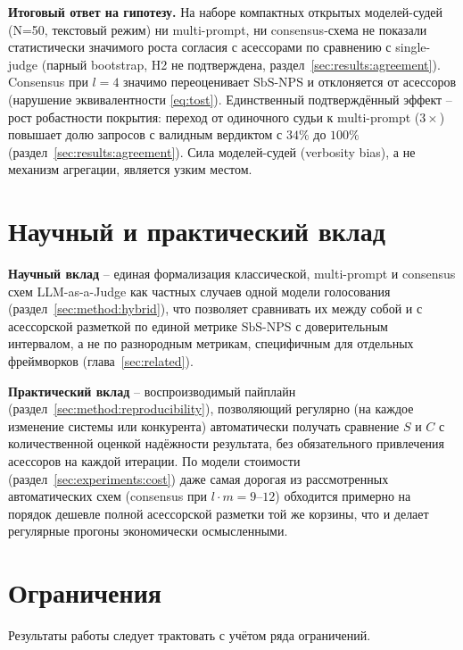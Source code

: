 \textbf{Итоговый ответ на гипотезу.}
На наборе компактных открытых моделей-судей (N=50, текстовый режим) ни multi-prompt, ни consensus-схема не показали статистически значимого роста согласия с асессорами по сравнению с single-judge (парный bootstrap, H2 не подтверждена, раздел~\ref{sec:results:agreement}). Consensus при $l=4$ значимо переоценивает $\mathrm{SbS\text{-}NPS}$ и отклоняется от асессоров (нарушение эквивалентности \eqref{eq:tost}). Единственный подтверждённый эффект -- рост робастности покрытия: переход от одиночного судьи к multi-prompt ($3\times$) повышает долю запросов с валидным вердиктом с $34\%$ до $100\%$ (раздел~\ref{sec:results:agreement}). Сила моделей-судей (verbosity bias), а не механизм агрегации, является узким местом.

\section{Научный и практический вклад}

\textbf{Научный вклад} -- единая формализация классической,
multi-prompt и consensus схем LLM-as-a-Judge как частных случаев одной
модели голосования (раздел~\ref{sec:method:hybrid}), что позволяет
сравнивать их между собой и с асессорской разметкой по единой метрике
$\mathrm{SbS\text{-}NPS}$ с доверительным интервалом, а не по
разнородным метрикам, специфичным для отдельных фреймворков
(глава~\ref{sec:related}).

\textbf{Практический вклад} -- воспроизводимый пайплайн
(раздел~\ref{sec:method:reproducibility}), позволяющий регулярно (на
каждое изменение системы или конкурента) автоматически получать
сравнение $S$ и $C$ с количественной оценкой надёжности результата, без
обязательного привлечения асессоров на каждой итерации.
По модели стоимости (раздел~\ref{sec:experiments:cost}) даже самая
дорогая из рассмотренных автоматических схем (consensus при
$l \cdot m = 9$--$12$) обходится примерно на порядок дешевле полной
асессорской разметки той же корзины, что и делает регулярные прогоны
экономически осмысленными.

\section{Ограничения}

Результаты работы следует трактовать с учётом ряда ограничений.

